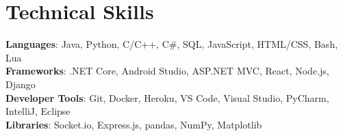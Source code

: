 \documentclass[letterpaper,12pt]{article}
\begin{document}
%
\section{Technical Skills}
 \begin{itemize}[leftmargin=0.15in, label={}]
    \small{\item{
     \textbf{Languages}{: Java, Python, C/C++, C\#, SQL, JavaScript, HTML/CSS, Bash, Lua} \\
     \textbf{Frameworks}{: .NET Core, Android Studio, ASP.NET MVC, React, Node.js, Django} \\
     \textbf{Developer Tools}{: Git, Docker, Heroku, VS Code, Visual Studio, PyCharm, IntelliJ, Eclipse} \\
     \textbf{Libraries}{: Socket.io, Express.js, pandas, NumPy, Matplotlib}
    }}
 \end{itemize}


\end{document}
